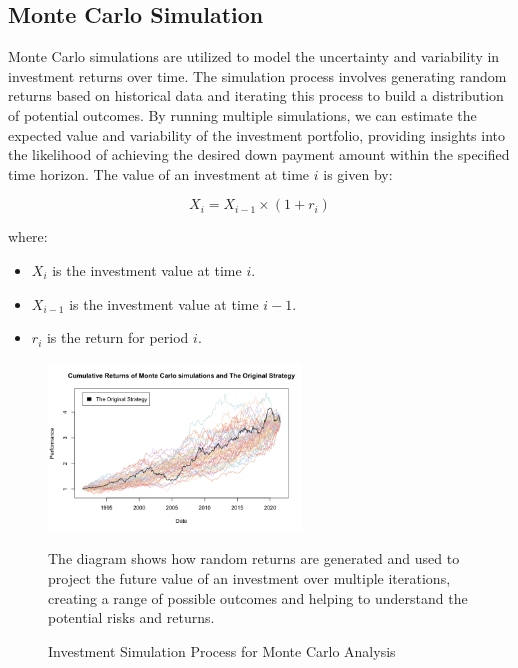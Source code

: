 \subsection{Monte Carlo Simulation}
Monte Carlo simulations are utilized to model the uncertainty and variability in investment returns over time. The simulation process involves generating random returns based on historical data and iterating this process to build a distribution of potential outcomes. By running multiple simulations, we can estimate the expected value and variability of the investment portfolio, providing insights into the likelihood of achieving the desired down payment amount within the specified time horizon. The value of an investment at time $i$ is given by:

\begin{equation}
X_i = X_{i-1} \times (1 + r_i)
\end{equation}

where:
\begin{itemize}
    \item $X_i$ is the investment value at time $i$.
    \item $X_{i-1}$ is the investment value at time $i-1$.
    \item $r_i$ is the return for period $i$.
\end{itemize}


\begin{figure}[h!]
    \centering
    \includegraphics[width=0.6\textwidth]{../Figures/investment_simulation_process.png}
    \caption{Investment Simulation Process for Monte Carlo Analysis}
    \label{fig:investment_simulation}
    \subcaption The diagram shows how random returns are generated and used to project the future value of an investment over multiple iterations, creating a range of possible outcomes and helping to understand the potential risks and returns.
\end{figure}


\newpage
